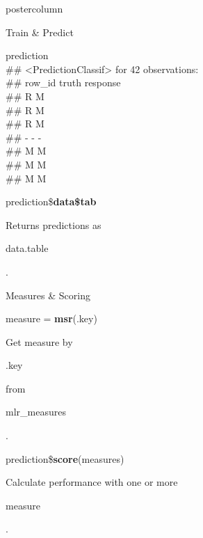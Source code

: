 \documentclass{beamer}
\newcommand{\codeinline}[1]{\begin{codeboxinline}#1\end{codeboxinline}}
\begin{document}
\begin{frame}[fragile]{}
\begin{columns}
\begin{column}{.245\textwidth}
\begin{beamercolorbox}[center]{postercolumn}
\begin{minipage}{.98\textwidth}
{\begin{myblock}{Train \& Predict}
\begin{codeboxmultiline}[width=23cm]
								{\footnotesize prediction\\
								\#\# <PredictionClassif> for 42 observations:\\
								\#\# row\_id truth response\\
								\#\# \space\space\space\space\space 2
								\space\space\space\space R \space\space\space\space\space\space\space M\\
								\#\# \space\space\space\space\space 3
								\space\space\space\space R \space\space\space\space\space\space\space M\\
								\#\# \space\space\space\space\space 5
								\space\space\space\space R \space\space\space\space\space\space\space M\\
								\#\# - - -\\
								\#\# \space\space\space 198
								\space\space\space\space M \space\space\space\space\space\space\space M\\
								\#\# \space\space{}00
								\space\space\space\space M \space\space\space\space\space\space\space M\\
								\#\# \space\space\space 207
								\space\space\space\space M \space\space\space\space\space\space\space M}
	                        \end{codeboxmultiline}
							\vspace{1em}
							\begin{codebox}
								prediction\$\textbf{data\$tab}
							\end{codebox}
							Returns predictions as \codeinline{data.table}.
	                    \end{myblock}
	                    \begin{myblock}{Measures \& Scoring}
							\begin{codebox}
								measure = \textbf{msr}(.key)
							\end{codebox}
							Get measure by \codeinline{.key} from \codeinline{mlr\_measures}.
							\\
							\begin{codebox}
								prediction\$\textbf{score}(measures)
							\end{codebox}
							Calculate performance with one or more \codeinline{measure}.
						\end{myblock}
					\vfill}
				\end{minipage}
			\end{beamercolorbox}
		\end{column}
	\end{columns}
\end{frame}
\end{document}
